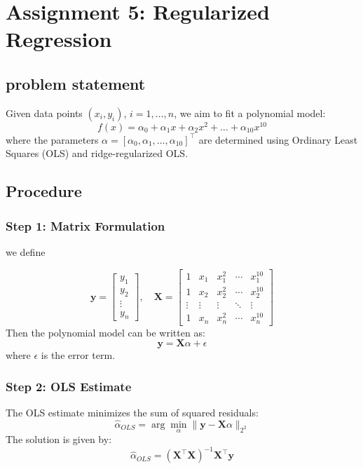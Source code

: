 \chapter{Assignment 5: Regularized Regression}


\section{problem statement}
Given data points $(x_i, y_i)$, $i = 1, \dots, n$, we aim to fit a polynomial model:
\begin{equation}
f(x) = \alpha_0 + \alpha_1 x + \alpha_2 x^2 + \dots + \alpha_{10} x^{10}
\end{equation}
where the parameters $\alpha = [\alpha_0, \alpha_1, \dots, \alpha_{10}]^\top$ are determined using Ordinary Least Squares (OLS) and ridge-regularized OLS.

\section{Procedure}
\subsection*{Step 1: Matrix Formulation}
we define

\begin{equation}
\mathbf{y} = 
\begin{bmatrix}
y_1 \\
y_2 \\
\vdots \\
y_n
\end{bmatrix}, \quad
\mathbf{X} = 
\begin{bmatrix}
1 & x_1 & x_1^2 & \cdots & x_1^{10} \\
1 & x_2 & x_2^2 & \cdots & x_2^{10} \\
\vdots & \vdots & \vdots & \ddots & \vdots \\
1 & x_n & x_n^2 & \cdots & x_n^{10}
\end{bmatrix}
\end{equation}
Then the polynomial model can be written as:
\begin{equation}
\mathbf{y} = \mathbf{X} \alpha + \epsilon
\end{equation}
where $\epsilon$ is the error term.

\subsection*{Step 2: OLS Estimate}
The OLS estimate minimizes the sum of squared residuals:
\begin{equation}
\hat{\alpha}_{OLS} = \arg \min_\alpha \|\mathbf{y} - \mathbf{X} \alpha\|_{2^{2}}
\end{equation}
The solution is given by:
\begin{equation}
\hat{\alpha}_{OLS} = (\mathbf{X}^\top \mathbf{X})^{-1} \mathbf{X}^\top \mathbf{y}
\end{equation}

